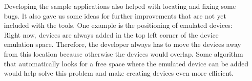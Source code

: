 Developing the sample applications also helped with locating and fixing some bugs. It also gave us some ideas for further improvements that are not yet included with the tools. One example is the positioning of emulated devices: Right now, devices are always added in the top left corner of the device emulation space. Therefore, the developer always has to move the devices away from this location because otherwise the devices would overlap. Some algorithm that automatically looks for a free space where the emulated device can be added would help solve this problem and make creating devices even more efficient.